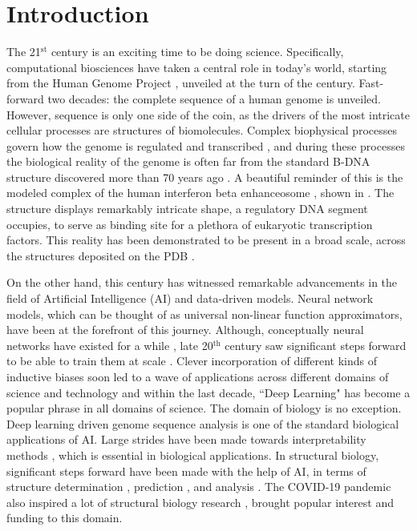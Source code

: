 \section*{Introduction}

The 21$^{\text{st}}$ century is an exciting time to be doing science. Specifically, computational biosciences have taken a central role in today's world, starting from the Human Genome Project \citep{international2001initial}, unveiled at the turn of the century. Fast-forward  two decades: the complete sequence of a human genome  \citep{nurk2022complete} is unveiled. However, sequence is only one side of the coin, as the drivers of the most intricate cellular processes are structures of biomolecules. Complex biophysical processes govern how the genome is regulated and transcribed \citep{lambert2018human}, and during these processes the biological reality of the genome is often far from the standard B-DNA structure discovered more than 70 years ago \citep{watson1953}. A beautiful reminder of this is the modeled complex of the human interferon beta enhanceosome \citep{panne2007atomic}, shown in . The structure displays remarkably intricate shape, a regulatory DNA segment occupies, to serve as binding site for a plethora of eukaryotic transcription factors. This reality has been demonstrated \citep{rohs2009role} to be present in a broad scale, across the structures deposited on the PDB \citep{berman2000protein}. 

On the other hand, this century has witnessed remarkable advancements in the field of Artificial Intelligence (AI) and data-driven models. Neural network models, which can be thought of as universal non-linear function approximators, have been at the forefront of this journey. Although, conceptually neural networks have existed for a while \citep{kleene1951representationof}, late 20$^{\text{th}}$ century saw significant steps forward to be able to train them at scale \citep{linnainmaa1976taylor, rumelhart1986learning,anderson2000talking,}. Clever incorporation of different kinds of inductive biases soon led to a wave of applications across different domains of science and technology \citep{lecun1989backpropagation, krizhevsky2012imagenet,lecun1998gradient,lecun1995convolutional,deng2009imagenet} and within the last decade, ``Deep Learning" \citep{lecun2015deep} has become a popular phrase in all domains of science. The domain of biology is no exception. Deep learning driven genome sequence analysis \citep{kelley2018sequential} is one of the standard biological applications of AI. Large strides have been made towards interpretability methods \citep{shrikumar2017learning}, which is essential in biological applications. In structural biology, significant steps forward have been made with the help of AI, in terms of structure determination \citep{zhong2021cryodrgn}, prediction \citep{Jumper2021, baek2024na, Baek2021, Krishna2024, Abramson2024}, and analysis \citep{Li2023, li2023geobind, gainza2020deciphering, gainza2023novo}. The COVID-19 pandemic also inspired a lot of structural biology research \citep{he2024ribonanza, yan2022structural, jackson2022mechanisms}, brought popular interest and funding to this domain. 

